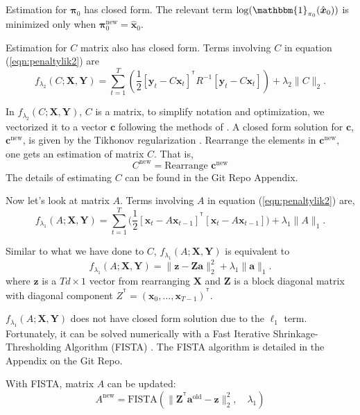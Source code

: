 \documentclass[fleqn,12pt]{article}
\let\oldref\ref
\renewcommand{\ref}[1]{(\oldref{#1})}
\newcommand{\T}{^{\ensuremath{\mathsf{T}}}}           %
\providecommand{\mb}[1]{\boldsymbol{#1}}
\newcommand{\bx}{\mb{x}}
\newcommand{\by}{\mb{y}}
\newcommand{\bX}{\mb{X}}
\newcommand{\bY}{\mb{Y}}
\begin{document}
Estimation for $\mathbf{\pi}_0$ has closed form. The relevant term $\log(\mathbbm{1}_{\mathbf{\pi}_0}(\hat{\bx}_0))$ is minimized only when $\mathbf{\pi}_0^{\text{new}} = \hat{\bx}_0$.

Estimation for $C$ matrix also has closed form. Terms involving $C$ in equation \ref{eqn:penaltylik2} are
\begin{equation*}
f_{\lambda_2}(C;\bX,\bY) = \sum\limits_{t=1}^{T}\left(\frac{1}{2}[\by_t-C\bx_t]^{\T}R^{-1}[\by_t-C\bx_t]\right)+\lambda_2 \|C\|_2.
\end{equation*}

In $f_{\lambda_2}(C;\bX,\bY)$, $C$ is a matrix, to simplify notation and optimization, we vectorized it to a vector $\mathbf{c}$ following the methods of \citet{turlach2005simultaneous}. A closed form solution for $\mathbf{c}$, $\mathbf{c}^{\text{new}}$, is given by the Tikhonov regularization \citep{tikhonov1943stability}. Rearrange the elements in $\mathbf{c}^{\text{new}}$, one gets an estimation of matrix $C$. That is, 
\begin{equation}\label{eq:updatec}
C^{\text{new}} =\text{Rearrange } \mathbf{c}^{\text{new}}
\end{equation}
The details of estimating $C$ can be found in the Git Repo Appendix.

Now let's look at matrix $A$. Terms involving $A$ in equation \ref{eqn:penaltylik2} are,
\begin{equation*}
f_{\lambda_1}(A;\bX,\bY) = \sum\limits_{t=1}^{T}\big(\frac{1}{2}[\bx_t-A\bx_{t-1}]^{\T}[\bx_t-A\bx_{t-1}]\big)+\lambda_1 \|A\|_1.
\end{equation*}

Similar to what we have done to $C$, $f_{\lambda_1}(A;\bX,\bY)$ is equivalent to
\begin{equation*}
f_{\lambda_1}(A;\bX,\bY) =  \|\mathbf{z}  - \mathbf{Za}\|_2^2 + \lambda_1\|\mathbf{a}\|_1.
\end{equation*}
where $\mathbf{z}$ is a $Td \times 1$ vector from rearranging $\bX$ and $\mathbf{Z}$ is a block diagonal matrix with diagonal component $Z^{\T} =(\bx_0,\ldots,\bx_{T-1})^{\T}$. 


$f_{\lambda_1}(A;\bX,\bY)$ does not have closed form solution due to the $\ell_1$ term. Fortunately, it can be solved numerically with a Fast Iterative Shrinkage-Thresholding Algorithm (FISTA) \citep{beck2009fast}. The FISTA algorithm is detailed in the Appendix on the Git Repo.

With FISTA, matrix $A$ can be updated:
\begin{equation}\label{eq:updatea}
A^{\text{new}} = \text{FISTA}(\|\mathbf{Z}^{\T}\mathbf{a}^{\text{old}} -\mathbf{z}\|_2^2,\quad \lambda_1)
\end{equation}
\end{document}
